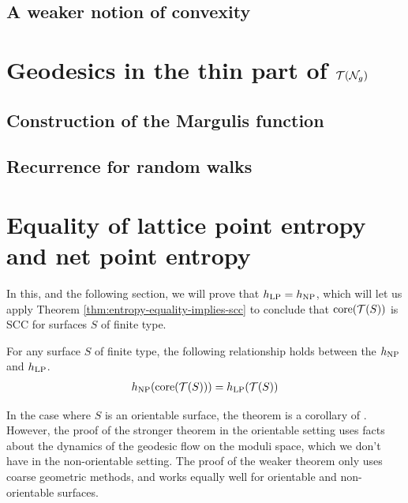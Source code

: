 \documentclass[12pt, reqno]{amsart}
\begin{document}
\subsection{A weaker notion of convexity}
\label{sec:weak-noti-conv}



\section{Geodesics in the thin part of $\mathcal{T}(\mathcal{N}_g)$}
\label{sec:recurr-rand-walks}


\subsection{Construction of the Margulis function}
\label{sec:constr-marg-funct}

\subsection{Recurrence for random walks}
\label{sec:recurr-rand-walks-1}

\section{Equality of lattice point entropy and net point entropy}
\label{sec:equal-latt-point}


In this, and the following section, we will prove that $h_{\mathrm{LP}} = h_{\mathrm{NP}}$, which will let us apply Theorem \ref{thm:entropy-equality-implies-scc} to conclude that $\mathrm{core}(\mathcal{T}(S))$ is SCC for surfaces $S$ of finite type.
\begin{theorem}
  \label{thm:entropy-equality}
  For any surface $S$ of finite type, the following relationship holds between the $h_{\mathrm{NP}}$ and $h_{\mathrm{LP}}$.
  \begin{align*}
    h_{\mathrm{NP}}(\mathrm{core}(\mathcal{T}(S))) = h_{\mathrm{LP}}(\mathcal{T}(S))
  \end{align*}
\end{theorem}

\begin{rem}
  In the case where $S$ is an orientable surface, the theorem is a corollary of \textcite[Theorem 1.2]{10.1215/00127094-1548443}.
  However, the proof of the stronger theorem in the orientable setting uses facts about the dynamics of the geodesic flow on the moduli space, which we don't have in the non-orientable setting.
  The proof of the weaker theorem only uses coarse geometric methods, and works equally well for orientable and non-orientable surfaces.
\end{rem}
\end{document}
